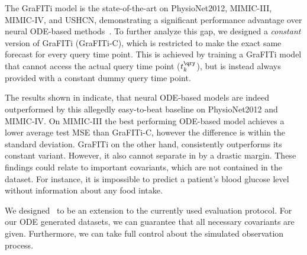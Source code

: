 The GraFITi model is the state-of-the-art on PhysioNet2012, MIMIC-III, MIMIC-IV, and USHCN, demonstrating a significant performance advantage over neural ODE-based methods~\citep{Yalavarthi2024.GraFITi}.
To further analyze this gap, we designed a \emph{constant}
version of GraFITi (GraFITi-C),
which is restricted to  make the exact same forecast
for every query time point.
This is achieved by training a GraFITi model that cannot access the actual query time point
($t^\qry_k$), but is instead always provided with a constant dummy query time point.

The results shown in  indicate,
that neural ODE-based models are indeed outperformed
by this allegedly easy-to-beat baseline on PhysioNet2012 and
MIMIC-IV\@. On MIMIC-III the best performing ODE-based
model achieves a lower average test MSE than GraFITi-C,
however the difference is within the standard deviation.
GraFITi on the other hand, consistently outperforms its
constant variant. However, it also cannot separate in by a drastic margin.
These findings could relate to important covariants, which are not contained
in the dataset. For instance, it is impossible to predict a patient's blood glucose level without information about any food intake.

We designed \Bench~to be an extension to the currently used evaluation protocol.
For our ODE generated datasets, we can guarantee that all necessary covariants are given.
Furthermore, we can take full control about the simulated observation process.


